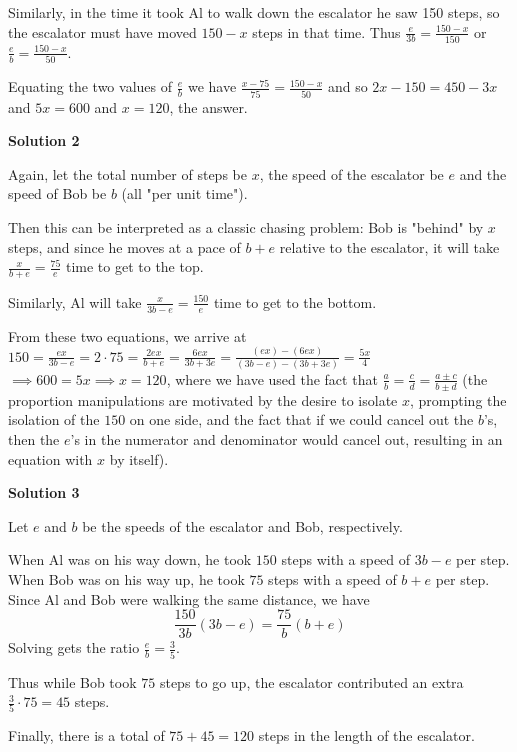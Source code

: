\begin{enumerate}
 Similarly, in the time it took Al to walk down the escalator he saw 150 steps, so the escalator must have moved $150 - x$ steps in that time.  Thus $\frac{e}{3b} = \frac{150 - x}{150}$ or $\frac{e}{b} = \frac{150 - x}{50}$.

 Equating the two values of $\frac{e}{b}$ we have $\frac{x - 75}{75} = \frac{150 - x}{50}$ and so $2x - 150 = 450 - 3x$ and $5x = 600$ and $x = \boxed{120}$, the answer.

 



\textbf{Solution 2}

Again, let the total number of steps be $x$, the speed of the escalator be $e$ and the speed of Bob be $b$ (all "per unit time").

 Then this can be interpreted as a classic chasing problem: Bob is "behind" by $x$ steps, and since he moves at a pace of $b+e$ relative to the escalator, it will take $\frac{x}{b+e}=\frac{75}{e}$ time to get to the top.

 Similarly, Al will take $\frac{x}{3b-e}=\frac{150}{e}$ time to get to the bottom.

 From these two equations, we arrive at $150=\frac{ex}{3b-e}=2\cdot75=\frac{2ex}{b+e}=\frac{6ex}{3b+3e}=\frac{(ex)-(6ex)}{(3b-e)-(3b+3e)}=\frac{5x}{4}$$\implies600=5x\implies x=\boxed{120}$, where we have used the fact that $\frac{a}{b}=\frac{c}{d}=\frac{a\pm c}{b\pm d}$ (the proportion manipulations are motivated by the desire to isolate $x$, prompting the isolation of the $150$ on one side, and the fact that if we could cancel out the $b$'s, then the $e$'s in the numerator and denominator would cancel out, resulting in an equation with $x$ by itself).

 



\textbf{Solution 3}

Let $e$ and $b$ be the speeds of the escalator and Bob, respectively.

 When Al was on his way down, he took $150$ steps with a speed of $3b-e$ per step. When Bob was on his way up, he took $75$ steps with a speed of $b+e$ per step. Since Al and Bob were walking the same distance, we have
 \[\frac{150}{3b}(3b-e)=\frac{75}{b}(b+e)\]Solving gets the ratio $\frac{e}{b}=\frac{3}{5}$.

 Thus while Bob took $75$ steps to go up, the escalator contributed an extra $\frac{3}{5}\cdot75=45$ steps.

 Finally, there is a total of $75+45=\boxed{120}$ steps in the length of the escalator.


\end{enumerate}

